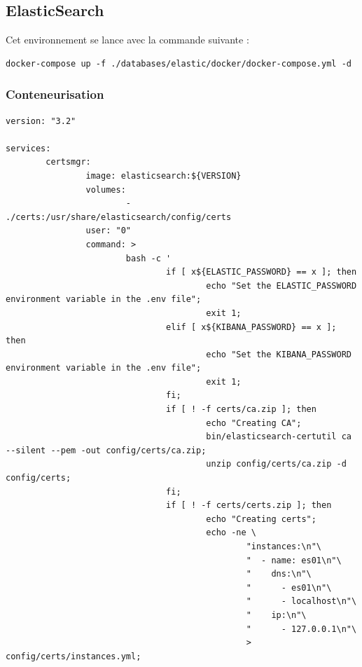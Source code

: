 \documentclass[a4paper,12pt]{article}
\begin{document}
	\subsection{ElasticSearch} \label{ES}
		Cet environnement se lance avec la commande suivante :
		\begin{verbatim}
docker-compose up -f ./databases/elastic/docker/docker-compose.yml -d		
		\end{verbatim}
		
		\subsubsection{Conteneurisation}
			\begin{lstlisting}[title=DockerCompose]
version: "3.2"

services:
        certsmgr:
                image: elasticsearch:${VERSION}
                volumes:
                        - ./certs:/usr/share/elasticsearch/config/certs
                user: "0"
                command: >
                        bash -c '
                                if [ x${ELASTIC_PASSWORD} == x ]; then
                                        echo "Set the ELASTIC_PASSWORD environment variable in the .env file";
                                        exit 1;
                                elif [ x${KIBANA_PASSWORD} == x ]; then
                                        echo "Set the KIBANA_PASSWORD environment variable in the .env file";
                                        exit 1;
                                fi;
                                if [ ! -f certs/ca.zip ]; then
                                        echo "Creating CA";
                                        bin/elasticsearch-certutil ca --silent --pem -out config/certs/ca.zip;
                                        unzip config/certs/ca.zip -d config/certs;
                                fi;
                                if [ ! -f certs/certs.zip ]; then
                                        echo "Creating certs";
                                        echo -ne \
                                                "instances:\n"\
                                                "  - name: es01\n"\
                                                "    dns:\n"\
                                                "      - es01\n"\
                                                "      - localhost\n"\
                                                "    ip:\n"\
                                                "      - 127.0.0.1\n"\
                                                > config/certs/instances.yml;

\end{lstlisting}
\end{document}
